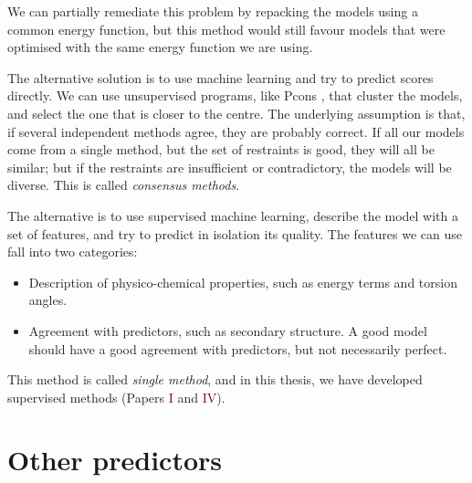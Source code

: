 We can partially remediate this problem by repacking the models using a common energy function, but this method would still favour models that were optimised with the same energy function we are using.


The alternative solution is to use machine learning and try to predict scores directly.
We can use unsupervised programs, like Pcons \citep{pcons}, that cluster the models, and select the one that is closer to the centre.
The underlying assumption is that, if several independent methods agree, they are probably correct.
If all our models come from a single method, but the set of restraints is good, they will all be similar; but if the restraints are insufficient or contradictory, the models will be diverse.
This is called \emph{consensus methods}.

The alternative is to use supervised machine learning,
describe the model with a set of features, and try to predict in isolation its quality.
The features we can use fall into two categories:

\begin{itemize}
\item Description of physico-chemical properties, such as energy terms and torsion angles.
\item Agreement with predictors, such as secondary structure. A good model should have a good agreement with predictors, but not necessarily perfect.
\end{itemize}

This method is called \emph{single method}, and in this thesis, we have developed supervised methods (Papers \textcolor{Maroon}{I} and \textcolor{Maroon}{IV}).

\section{Other predictors}
